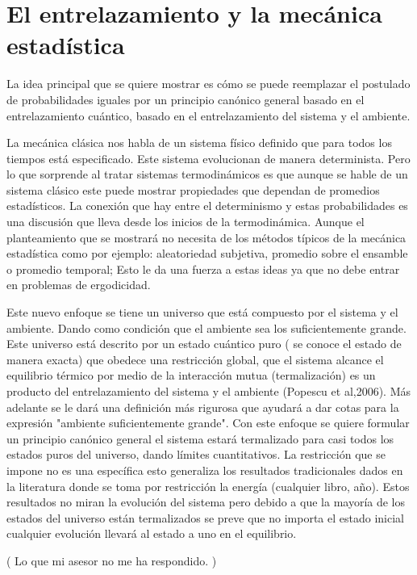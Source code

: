 \chapter{El entrelazamiento y la mecánica estadística}

La idea principal que se quiere mostrar es cómo se puede reemplazar el postulado de probabilidades iguales por un principio canónico general basado en el entrelazamiento cuántico, basado en el entrelazamiento del sistema y el ambiente.

La mecánica clásica nos habla de un sistema físico definido que para todos los tiempos está especificado. Este sistema evolucionan de manera determinista. Pero lo que sorprende al tratar sistemas termodinámicos es que aunque se hable de un sistema clásico este puede mostrar propiedades que dependan de promedios estadísticos. La conexión que hay entre el determinismo y estas probabilidades es una discusión que lleva desde los inicios de la termodinámica. Aunque el planteamiento que se mostrará no necesita de los métodos típicos de la mecánica estadística como por ejemplo: aleatoriedad subjetiva, promedio sobre el ensamble o promedio temporal; Esto le da una fuerza a estas ideas ya que no debe entrar en problemas de ergodicidad. 

Este nuevo enfoque se tiene un universo que está compuesto por el sistema y el ambiente. Dando como condición que el ambiente sea los suficientemente grande. Este universo está descrito por un estado cuántico puro ( se conoce el estado de manera exacta) que obedece una restricción global, que el sistema alcance el equilibrio térmico por medio de la interacción mutua (termalización) es un producto del entrelazamiento del sistema y el ambiente (Popescu et al,2006). Más adelante se le dará una definición más rigurosa que ayudará a dar cotas para la expresión "ambiente suficientemente grande". Con este enfoque se quiere formular un principio canónico general  el sistema estará termalizado para casi todos los estados puros del universo, dando límites cuantitativos. La restricción que se impone no es una específica esto generaliza los resultados tradicionales dados en la literatura donde se toma por restricción la energía (cualquier libro, año).
Estos resultados no miran la evolución del sistema pero debido a que la mayoría de los estados del universo están termalizados se preve que no importa el estado inicial cualquier evolución llevará al estado a uno en el equilibrio.

(
Lo que mi asesor no me ha respondido.
)

